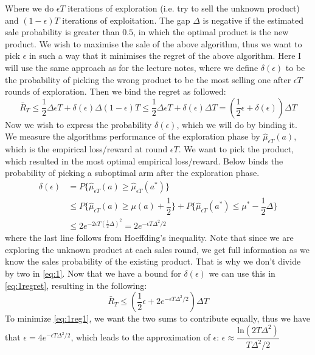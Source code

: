 \documentclass{article}
\begin{document}
Where we do $\epsilon T$ iterations of exploration (i.e. try to sell the unknown product) and $(1-\epsilon)T$ iterations of exploitation. The gap $\Delta$ is negative if the estimated sale probability is greater than $0.5$, in which the optimal product is the new product. We wish to maximise the sale of the above algorithm, thus we want to pick $\epsilon$ in such a way that it minimises the regret of the above algorithm. Here I will use the same approach as for the lecture notes, where we define $\delta(\epsilon)$ to be the probability of picking the wrong product to be the most selling one after $\epsilon T$ rounds of exploration. Then we bind the regret as followed:
\begin{equation}
\label{eq:1regret}
\bar{R}_T \leq \dfrac{1}{2} \Delta \epsilon T + \delta(\epsilon) \Delta(1-\epsilon) T \leq \dfrac{1}{2} \Delta \epsilon T + \delta(\epsilon) \Delta T = \left( \dfrac{1}{2} \epsilon + \delta(\epsilon) \right) \Delta T 
\end{equation}
Now we wish to express the probability $\delta(\epsilon)$, which we will do by binding it. We measure the algorithms performance of the exploration phase by $\hat{\mu}_{\epsilon T}(a)$, which is the empirical loss/reward at round $\epsilon T$. We want to pick the product, which resulted in the most optimal empirical loss/reward. Below binds the probability of picking a suboptimal arm after the exploration phase.
\begin{align}
\delta(\epsilon) &= P \lbrace \hat{\mu}_ {\epsilon T}(a) \geq \hat{\mu}_{\epsilon T}(a^*)  \rbrace \\
&\leq P \lbrace \hat{\mu}_{\epsilon T} (a) \geq \mu(a) + \dfrac{1}{2} \rbrace + P \lbrace \hat{\mu}_{\epsilon T}(a^*) \leq \mu^* - \dfrac{1}{2} \Delta \rbrace \\
&\leq 2 e^{ -2 \epsilon T (\frac{1}{2} \Delta)^2} = 2 e ^{ -\epsilon T \Delta^2 / 2 }
\label{eq:1}
\end{align}
where the last line follows from Hoeffding's inequality. Note that since we are exploring the unknown product at each sales round, we get full information as we know the sales probability of the existing product. That is why we don't divide by two in \eqref{eq:1}. Now that we have a bound for $\delta(\epsilon)$ we can use this in \eqref{eq:1regret}, resulting in the following:
\begin{equation}
\label{eq:1reg1}
\bar{R}_T \leq \left( \dfrac{1}{2} \epsilon + 2 e ^{ -\epsilon T \Delta^2 / 2 } \right) \Delta T
\end{equation}
To minimize \eqref{eq:1reg1}, we want the two sums to contribute equally, thus we have that $\epsilon = 4 e ^{ -\epsilon T \Delta^2 / 2 }$, which leads to the approximation of $\epsilon$: $\epsilon \approx \dfrac{\text{ln}(2T \Delta^2 )}{T \Delta^2 / 2}$
\end{document}
